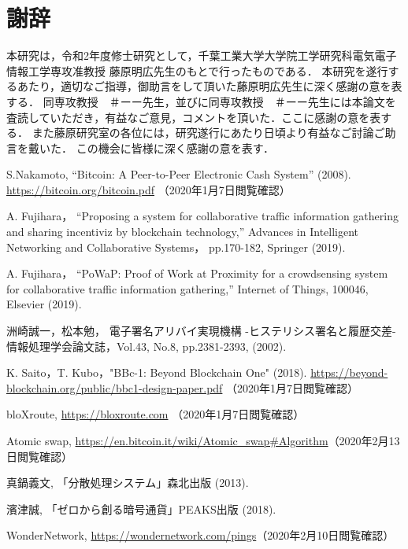 \documentclass[a4paper,12pt]{jsarticle}
\begin{document}
\newpage
\section*{謝辞}

本研究は，令和2年度修士研究として，千葉工業大学大学院工学研究科電気電子情報工学専攻准教授 藤原明広先生のもとで行ったものである．
本研究を遂行するあたり，適切なご指導，御助言をして頂いた藤原明広先生に深く感謝の意を表する．
同専攻教授　＃ーー先生，並びに同専攻教授　＃ーー先生には本論文を査読していただき，有益なご意見，コメントを頂いた．ここに感謝の意を表する．
また藤原研究室の各位には，研究遂行にあたり日頃より有益なご討論ご助言を戴いた．
この機会に皆様に深く感謝の意を表す．

\newpage

\begin{thebibliography}{99}
S.Nakamoto,
``Bitcoin: A Peer-to-Peer Electronic Cash System'' (2008).
\url {https://bitcoin.org/bitcoin.pdf} （2020年1月7日閲覧確認）

A. Fujihara，
``Proposing a system for collaborative traffic information gathering 
and sharing incentiviz by blockchain technology,''
Advances in Intelligent Networking and Collaborative Systems，
pp.170-182, Springer (2019).

A. Fujihara，
``PoWaP: Proof of Work at Proximity for a crowdsensing system for 
collaborative traffic information gathering,'' 
Internet of Things, 100046, Elsevier (2019).

洲崎誠一，松本勉，
電子署名アリバイ実現機構 -ヒステリシス署名と履歴交差-
情報処理学会論文誌，Vol.43, No.8, pp.2381-2393, (2002).

K. Saito，T. Kubo，"BBc-1: Beyond Blockchain One" (2018).
\url{https://beyond-blockchain.org/public/bbc1-design-paper.pdf} （2020年1月7日閲覧確認）

bloXroute, \url{https://bloxroute.com} （2020年1月7日閲覧確認）

Atomic swap, \url{https://en.bitcoin.it/wiki/Atomic_swap#Algorithm}（2020年2月13日閲覧確認）

真鍋義文, 「分散処理システム」森北出版 (2013).

濱津誠, 「ゼロから創る暗号通貨」PEAKS出版 (2018).

WonderNetwork, \url{https://wondernetwork.com/pings}（2020年2月10日閲覧確認）

\end{thebibliography} 
\end{document}
